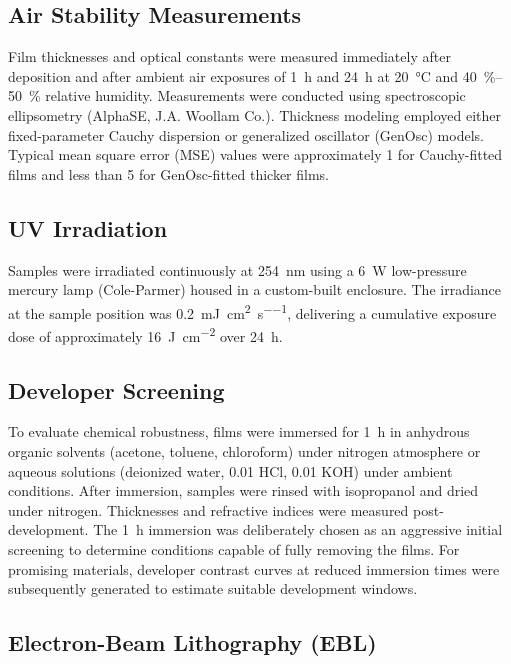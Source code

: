 \subsection{Air Stability Measurements}

Film thicknesses and optical constants were measured immediately after deposition and after ambient air exposures of \SI{1}{\hour} and \SI{24}{\hour} at \SI{20}{\celsius} and \SIrange{40}{50}{\percent} relative humidity. Measurements were conducted using spectroscopic ellipsometry (AlphaSE, J.A. Woollam Co.). Thickness modeling employed either fixed-parameter Cauchy dispersion or generalized oscillator (GenOsc) models. Typical mean square error (MSE) values were approximately 1 for Cauchy-fitted films and less than 5 for GenOsc-fitted thicker films.

\subsection{UV Irradiation}

Samples were irradiated continuously at \SI{254}{\nano\meter} using a \SI{6}{\watt} low-pressure mercury lamp (Cole-Parmer) housed in a custom-built enclosure. The irradiance at the sample position was \SI{0.2}{\milli\joule\per\centi\meter\squared\per\second}, delivering a cumulative exposure dose of approximately \SI{16}{\joule\per\centi\meter\squared} over \SI{24}{\hour}.
\textsc{}
\subsection{Developer Screening}

To evaluate chemical robustness, films were immersed for \SI{1}{\hour} in anhydrous organic solvents (acetone, toluene, chloroform) under nitrogen atmosphere or aqueous solutions (deionized water, \SI{0.01}{\molar} HCl, \SI{0.01}{\molar} KOH) under ambient conditions. After immersion, samples were rinsed with isopropanol and dried under nitrogen. Thicknesses and refractive indices were measured post-development. The \SI{1}{\hour} immersion was deliberately chosen as an aggressive initial screening to determine conditions capable of fully removing the films. For promising materials, developer contrast curves at reduced immersion times were subsequently generated to estimate suitable development windows.

\subsection{Electron-Beam Lithography (EBL)}

